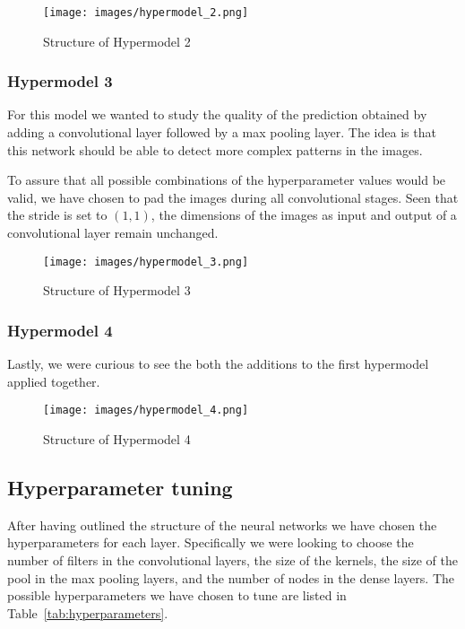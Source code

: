 \begin{figure}[h]
    \label{fig:Hypermodel_2}
    \centering
    \texttt{[image: images/hypermodel\_2.png]}
    \caption{Structure of Hypermodel 2}
\end{figure}

\subsubsection{Hypermodel 3}\label{hypermodel_3}
For this model we wanted to study the quality of the prediction obtained by adding a convolutional layer followed by a max pooling layer. The idea is that this network should be able to detect more complex patterns in the images.

To assure that all possible combinations of the hyperparameter values would be valid, we have chosen to pad the images during all convolutional stages. Seen that the stride is set to $(1,1)$, the dimensions of the images as input and output of a convolutional layer remain unchanged.

\begin{figure}[!]
    \label{fig:Hypermodel_3}
    \centering
    \texttt{[image: images/hypermodel\_3.png]}
    \caption{Structure of Hypermodel 3}
\end{figure}

\subsubsection{Hypermodel 4}\label{hypermodel_4}
Lastly, we were curious to see the both the additions to the first hypermodel applied together.

\begin{figure}[!]
    \label{fig:Hypermodel_4}
    \centering
    \texttt{[image: images/hypermodel\_4.png]}
    \caption{Structure of Hypermodel 4}
\end{figure}

\subsection{Hyperparameter tuning}\label{hyperparameter_tuning}
After having outlined the structure of the neural networks we have chosen the hyperparameters for each layer. Specifically we were looking to choose the number of filters in the convolutional layers, the size of the kernels, the size of the pool in the max pooling layers, and the number of nodes in the dense layers. The possible hyperparameters we have chosen to tune are listed in Table~\ref{tab:hyperparameters}.

